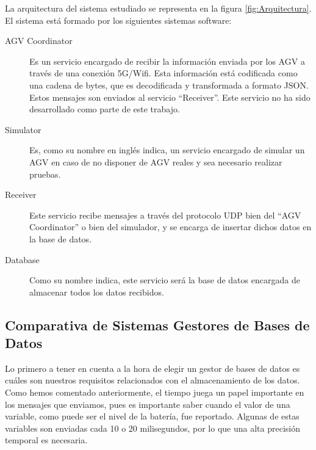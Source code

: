 La arquitectura del sistema estudiado se representa en la figura \ref*{fig:Arquitectura}. El sistema
está formado por los siguientes sistemas software:
\begin{description}
    \item [AGV Coordinator] Es un servicio encargado de recibir la información enviada por los AGV a
        través de una conexión 5G/Wifi. Esta información está codificada como una cadena de bytes, que
        es decodificada y transformada a formato JSON. Estos mensajes son enviados al servicio 
        ``Receiver''. Este servicio no ha sido desarrollado como parte de este trabajo.
    \item [Simulator] Es, como su nombre en inglés indica, un servicio encargado de simular un AGV
        en caso de no disponer de AGV reales y sea necesario realizar pruebas.
    \item [Receiver] Este servicio recibe mensajes a través del protocolo UDP bien del ``AGV Coordinator''
        o bien del simulador, y se encarga de insertar dichos datos en la base de datos.
    \item [Database] Como su nombre indica, este servicio será la base de datos encargada de almacenar
        todos los datos recibidos.
\end{description}


\subsection*{Comparativa de Sistemas Gestores de Bases de Datos}

Lo primero a tener en cuenta a la hora de elegir un gestor de bases de datos es cuáles son nuestros
requisitos relacionados con el almacenamiento de los datos. Como hemos comentado anteriormente, el tiempo
juega un papel importante en los mensajes que enviamos, pues es importante saber cuando el valor de
una variable, como puede ser el nivel de la batería, fue reportado. Algunas de estas variables son
enviadas cada 10 o 20 milisegundos, por lo que una alta precisión temporal es necesaria.

